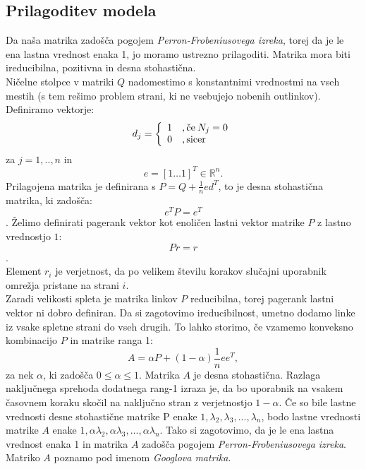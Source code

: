 \documentclass[a4paper]{article}
\begin{document}
\subsection{Prilagoditev modela}\hspace{4.8mm} Da naša matrika zadošča pogojem \textit{Perron-Frobeniusovega izreka}, torej da je le ena lastna vrednost enaka 1, jo moramo ustrezno prilagoditi. Matrika mora biti ireducibilna, pozitivna in desna stohastična.\\
 Ničelne stolpce v matriki $Q$ nadomestimo s konstantnimi vrednostmi na vseh mestih (s tem rešimo problem strani, ki ne vsebujejo nobenih outlinkov). 
\\Definiramo vektorje: \\
\[
d_j = 
\left \{
	\begin{array}{ll}
		1  &, \mbox{če}\hspace{0.8mm} N_j = 0 \\
		0 &, \mbox{sicer} 
	\end{array}
\right. \]
za $j = 1, .., n$ in
$$e = [1 … 1] ^T \in \mathbb{R}^n.$$
Prilagojena matrika je definirana s $ P = Q + \frac{1}{n}ed^T$, to je desna stohastična matrika, ki zadošča:
$$e^TP = e^T$$.
Želimo definirati pagerank vektor kot enoličen lastni vektor matrike $P$ z lastno vrednostjo $1$:
$$Pr=r$$. \\
Element $r_i$ je verjetnost, da po velikem številu korakov slučajni uporabnik omrežja pristane na strani $i$.\\
Zaradi velikosti spleta je matrika linkov $P$ reducibilna, torej pagerank lastni vektor ni dobro definiran. Da si zagotovimo ireducibilnost, umetno dodamo linke iz vsake spletne strani do vseh drugih. To lahko storimo, če vzamemo konveksno kombinacijo $P$ in matrike ranga 1:
$$A=\alpha P + (1-\alpha)\frac{1}{n}ee^T,$$
za nek $\alpha$, ki zadošča $0 \leq \alpha \leq 1$. Matrika $A$ je desna stohastična. Razlaga naključnega sprehoda dodatnega rang-1 izraza je, da bo uporabnik na vsakem časovnem koraku skočil na naključno stran z verjetnostjo $1- \alpha$. Če so bile lastne vrednosti desne stohastične matrike P enake $1, \lambda_2, \lambda_3, ... , \lambda_n$, bodo lastne vrednosti matrike $A$ enake $1, \alpha \lambda_2, \alpha \lambda_3, ... , \alpha \lambda_n$. Tako si zagotovimo, da je le ena lastna vrednost enaka 1 in matrika $A$ zadošča pogojem \textit{Perron-Frobeniusovega izreka}. Matriko $A$ poznamo pod imenom \textit{Googlova matrika}.
\end{document}
